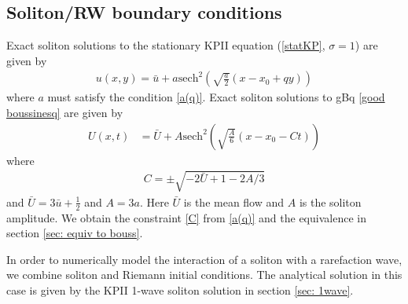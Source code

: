 \documentclass[12pt]{article}
\newcommand{\sech}[0]{\mathrm{sech}}
\numberwithin{equation}{section}
\begin{document}
\subsection{Soliton/RW boundary conditions}
Exact soliton solutions to the stationary KPII equation (\eqref{statKP}, $\sigma =1$) are given by 
\begin{align}
    u(x,y) = \bar u + a\sech^2\left(\sqrt{\frac{a}{2}}(x-x_0+qy)\right)
\end{align}
where $a$ must satisfy the condition \eqref{a(q)}. Exact soliton solutions to gBq \eqref{good boussinesq} are given by 
\begin{align}
    U(x,t) &= \bar U + A\sech^2\left(\sqrt{\frac{A}{6}}\left(x-x_0 - Ct\right)\right)
\end{align}
where 
\begin{align}
    C = \pm \sqrt{-2\bar U + 1 - 2A/3} \label{C}
\end{align}
and $\bar U = 3\bar u + \frac{1}{2}$ and $A = 3a$. Here $\bar U$ is the mean flow and $A$ is the soliton amplitude. We obtain the constraint \eqref{C} from \eqref{a(q)} and the equivalence in section \eqref{sec: equiv to bouss}.

In order to numerically model the interaction of a soliton with a rarefaction wave, we combine soliton and Riemann initial conditions. The analytical solution in this case is given by the KPII 1-wave soliton solution in section \ref{sec: 1wave}.
\end{document}

